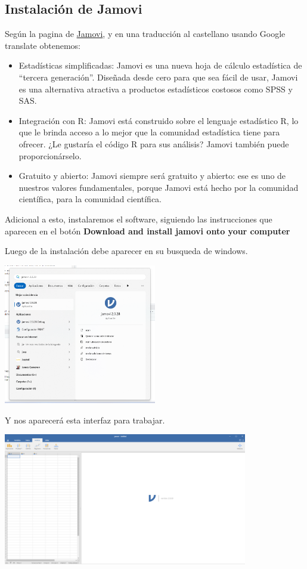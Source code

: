 \documentclass[
  letterpaper,
  DIV=11,
  numbers=noendperiod]{scrreprt}
\begin{document}
\subsection{Instalación de Jamovi}\label{instalaciuxf3n-de-jamovi}

Según la pagina de \href{https://www.jamovi.org/}{Jamovi}, y en una
traducción al castellano usando Google translate obtenemos:

\begin{itemize}
\item
  Estadísticas simplificadas: Jamovi es una nueva hoja de cálculo
  estadística de ``tercera generación''. Diseñada desde cero para que
  sea fácil de usar, Jamovi es una alternativa atractiva a productos
  estadísticos costosos como SPSS y SAS.
\item
  Integración con R: Jamovi está construido sobre el lenguaje
  estadístico R, lo que le brinda acceso a lo mejor que la comunidad
  estadística tiene para ofrecer. ¿Le gustaría el código R para sus
  análisis? Jamovi también puede proporcionárselo.
\item
  Gratuito y abierto: Jamovi siempre será gratuito y abierto: ese es uno
  de nuestros valores fundamentales, porque Jamovi está hecho por la
  comunidad científica, para la comunidad científica.
\end{itemize}

Adicional a esto, instalaremos el software, siguiendo las instrucciones
que aparecen en el botón \textbf{Download and install jamovi onto your
computer}

Luego de la instalación debe aparecer en su busqueda de windows.
\begin{center}
\includegraphics[width=0.5\textwidth,height=\textheight]{Figuras/JAM1.png}
\end{center}

Y nos aparecerá esta interfaz para trabajar.

\begin{center}
\includegraphics[width=0.8\textwidth,height=\textheight]{Figuras/JAM2.png}
\end{center}
\end{document}
